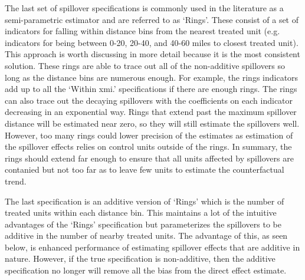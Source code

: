\documentclass[11pt]{article}
\begin{document}
The last set of spillover specifications is commonly used in the literature as a semi-parametric estimator and are referred to as `Rings'. These consist of a set of indicators for falling within distance bins from the nearest treated unit (e.g. indicators for being between 0-20, 20-40, and 40-60 miles to closest treated unit). This approach is worth discussing in more detail because it is the most consistent solution. These rings are able to trace out all of the non-additive spillovers so long as the distance bins are numerous enough. For example, the rings indicators add up to all the `Within xmi.' specifications if there are enough rings. The rings can also trace out the decaying spillovers with the coefficients on each indicator decreasing in an exponential way. Rings that extend past the maximum spillover distance will be estimated near zero, so they will still estimate the spillovers well. However, too many rings could lower precision of the estimates as estimation of the spillover effects relies on control units outside of the rings. In summary, the rings should extend far enough to ensure that all units affected by spillovers are contanied but not too far as to leave few units to estimate the counterfactual trend.

The last specification is an additive version of `Rings' which is the number of treated units within each distance bin. This maintains a lot of the intuitive advantages of the `Rings' specification but parameterizes the spillovers to be additive in the number of nearby treated units. The advantage of this, as seen below, is enhanced performance of estimating spillover effects that are additive in nature. However, if the true specification is non-additive, then the additive specification no longer will remove all the bias from the direct effect estimate.
\end{document}
